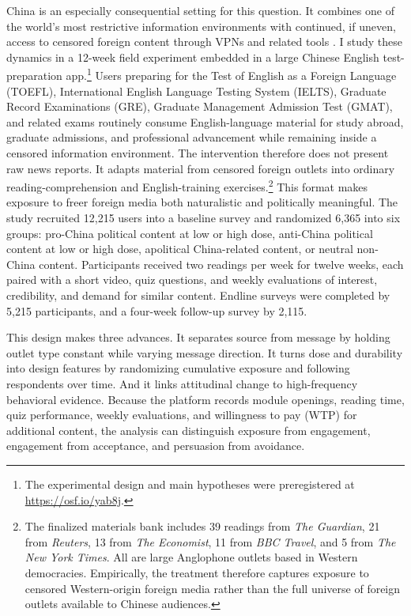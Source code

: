 \documentclass[12pt,american]{article}
\begin{document}
	China is an especially consequential setting for this question. It combines one of the world’s most restrictive information environments with continued, if uneven, access to censored foreign content through VPNs and related tools \citep{ChangEtAl2022,FreedomHouse2024,hobbsroberts2018}. I study these dynamics in a 12-week field experiment embedded in a large Chinese English test-preparation app.\footnote{The experimental design and main hypotheses were preregistered at \url{https://osf.io/yab8j}.} Users preparing for the Test of English as a Foreign Language (TOEFL), International English Language Testing System (IELTS), Graduate Record Examinations (GRE), Graduate Management Admission Test (GMAT), and related exams routinely consume English-language material for study abroad, graduate admissions, and professional advancement while remaining inside a censored information environment. The intervention therefore does not present raw news reports. It adapts material from censored foreign outlets into ordinary reading-comprehension and English-training exercises.\footnote{The finalized materials bank includes 39 readings from \textit{The Guardian}, 21 from \textit{Reuters}, 13 from \textit{The Economist}, 11 from \textit{BBC Travel}, and 5 from \textit{The New York Times}. All are large Anglophone outlets based in Western democracies. Empirically, the treatment therefore captures exposure to censored Western-origin foreign media rather than the full universe of foreign outlets available to Chinese audiences.} This format makes exposure to freer foreign media both naturalistic and politically meaningful. The study recruited 12,215 users into a baseline survey and randomized 6,365 into six groups: pro-China political content at low or high dose, anti-China political content at low or high dose, apolitical China-related content, or neutral non-China content. Participants received two readings per week for twelve weeks, each paired with a short video, quiz questions, and weekly evaluations of interest, credibility, and demand for similar content. Endline surveys were completed by 5,215 participants, and a four-week follow-up survey by 2,115.
	
	This design makes three advances. It separates source from message by holding outlet type constant while varying message direction. It turns dose and durability into design features by randomizing cumulative exposure and following respondents over time. And it links attitudinal change to high-frequency behavioral evidence. Because the platform records module openings, reading time, quiz performance, weekly evaluations, and willingness to pay (WTP) for additional content, the analysis can distinguish exposure from engagement, engagement from acceptance, and persuasion from avoidance.
	
\end{document}
